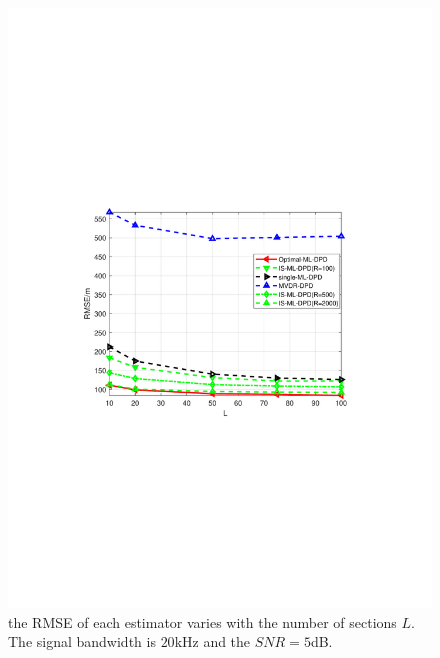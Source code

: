 \documentclass[review]{elsarticle}
\begin{document}
\begin{figure}[!t]
    \centerline{\includegraphics[width=1\textwidth]{pdfFigures/QvsRMSE(opt-IS(R100-500-2000)-SML-MVDR(1))SNR5dB.pdf}}
    \centering
	\caption{the RMSE of each estimator varies with the number of sections $L$. The signal bandwidth is $20$kHz and the $SNR=5$dB.}\label{fig4}
\end{figure}
\end{document}

